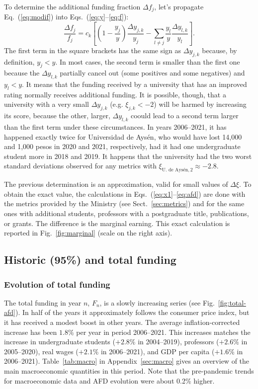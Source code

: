 \documentclass[twocolumn]{article}
\def\eqref#1{Eq.~(\ref{eq:#1})}
\def\eqsref#1#2{Eqs.~(\ref{eq:#1}--\ref{eq:#2})}
\begin{document}
To determine the additional funding fraction $\Delta f_j$, let's propagate 
\eqref{modif} into \eqsref{y}{f}:
\begin{equation}
    \frac{\Delta f_j}{f_j} = c_k \left[
                     \left(1 - \frac{y_{j}}y\right)\frac{\Delta y_{j,k}}{y_{j}}
                    - \sum_{l \ne j} \frac{y_l}y \frac{\Delta y_{l,k}}{y_l}
                 \right].
    \label{eq:deltafi}
\end{equation}
The first term in the square brackets has the same sign as $\Delta y_{j,k}$ because, by definition, $y_j < y$.  In most cases, the second term is smaller than the first one because the $\Delta y_{l,k}$ partially cancel out (some positives and some negatives) and $y_l < y$. It means that the funding received by a university that has an improved rating normally receives additional funding.  It is possible, though, that a university with a very small $\Delta y_{j,k}$ (e.g. $\xi_{j,k} < -2$) will be harmed by increasing its score, because the other, larger, $\Delta y_{l,k}$ coould lead to a second term larger than the first term under these circumstances. In years 2006--2021, it has happened exactly twice for Universidad de Aysén, who would have lost 14,000 and 1,000 pesos in 2020 and 2021, respectively, had it had one undergraduate student more in 2018 and 2019. It happens that the university had the two worst standard deviations observed for any metrics with $\xi_{\text{U. de Aysén},2} \approx -2.8$.

The previous determination is an approximation, valid for small values of $\Delta \xi$. To obtain the exact value, the calculations in \eqsref{x1}{afd} are done with the metrics provided by the Ministry (see Sect.~\ref{sec:metrics}) and for the same ones with additional students, professors with a postgraduate title, publications, or grants.  The difference is the marginal earning. This exact calculation is reported in Fig.~\ref{fig:marginal} (scale on the right axis).

\subsection{Historic (95\%) and total funding}

\subsubsection{Evolution of total funding}

The total funding in year $n$, $F_{n}$, is a slowly increasing series (see Fig.~\ref{fig:total-afd}). In half of the years it approximately follows the consumer price index, but it has received a modest boost in other years.  The average inflation-corrected increase has been $1.8$\% per year in period 2006--2021. This increases matches the increase in undergraduate students ($+2.8\%$ in 2004--2019), professors ($+2.6\%$ in 2005--2020), real wages ($+2.1\%$ in 2006--2021), and GDP per capita ($+1.6$\% in 2006--2021). Table~\ref{tab:macro} in Appendix~\ref{sec:macro} gives an overview of the main macroeconomic quantities in this period. Note that the pre-pandemic trends for macroeconomic data and AFD evolution were about 0.2\% higher. 
 
\end{document}
